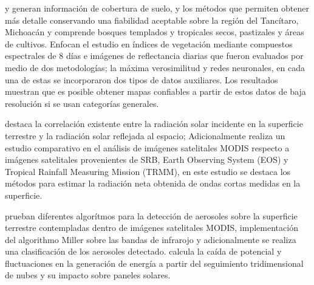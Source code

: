 \cite{mas2011aplicaciones} y \cite{ garcia2011evaluacion} generan información de cobertura de suelo, y los métodos que permiten obtener más detalle conservando una fiabilidad 
aceptable sobre la región del Tancítaro, Michoacán y comprende bosques templados y tropicales secos, pastizales y áreas 
de cultivos. Enfocan el estudio en índices de vegetación mediante compuestos espectrales de 8 días e imágenes de reflectancia diarias que 
fueron evaluados por medio de dos metodologías; la máxima verosimilitud y redes neuronales, en cada una de estas se incorporaron 
dos tipos de datos auxiliares. Los resultados muestran que es posible obtener mapas confiables a partir de estos datos de baja resolución 
si se usan categorías generales.

\cite{kim2008estimation} destaca la correlación existente entre la radiación solar incidente en la superficie terrestre y la radiación solar reflejada al espacio; Adicionalmente 
realiza un estudio comparativo en el análisis de  imágenes satelitales MODIS respecto a imágenes satelitales provenientes de SRB, Earth Observing System
(EOS) y Tropical Rainfall Measuring Mission (TRMM), en este estudio se destaca los métodos para estimar la radiación neta obtenida de ondas cortas 
medidas en la superficie.

\cite{alvarezprocesamiento} prueban diferentes algorítmos para la detección de aerosoles sobre la superficie terrestre
contempladas dentro de imágenes 
satelitales MODIS, implementación del algorithmo Miller sobre las bandas de infrarojo y adicionalmente se realiza 
una clasificación de los aerosoles detectado. \cite{hashimoto2012prediction} calcula la caída de potencial y
fluctuaciones en la generación de energía a partir del seguimiento tridimensional de nubes y su impacto sobre paneles solares.
